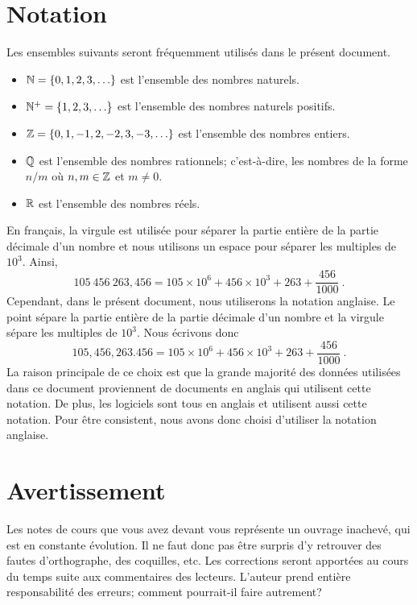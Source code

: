 \section*{Notation}

\begin{focus*}{\dfn}
Les ensembles suivants seront fréquemment utilisés dans le présent
document.
\begin{itemize}
\item $\mathbb{N} = \{0,1,2,3,\ldots \}$ est l'ensemble des nombres naturels.
\item $\mathbb{N}^+ = \{1,2,3,\ldots \}$ est l'ensemble des nombres naturels
positifs.
\item $\mathbb{Z} = \{0,1,-1,2,-2,3,-3, \ldots \}$ est l'ensemble des nombres
entiers.
\item $\mathbb{Q}$ est l'ensemble des nombres rationnels; c'est-à-dire, les
  nombres de la forme $n/m$ où $n,m \in \mathbb{Z}$ et $m \neq 0$.
\item $\mathbb{R}$ est l'ensemble des nombres réels.
\end{itemize}
\end{focus*}

En français, la virgule est utilisée pour séparer la partie entière de
la partie décimale d'un nombre et nous utilisons un espace pour séparer
les multiples de $10^3$.  Ainsi,
\[
105\ 456\ 263,456 =
105\times 10^6+ 456\times 10^3 + 263 + \frac{456}{1000} \ .
\]
Cependant, dans le présent document, nous utiliserons la notation
anglaise.  Le point sépare la partie entière de la partie décimale d'un
nombre et la virgule sépare les multiples de $10^3$.  Nous écrivons donc
\[
105,456,263.456 = 105\times 10^6+ 456\times 10^3 + 263 + \frac{456}{1000} \ .
\]
La raison principale de ce choix est que la grande majorité des
données utilisées dans ce document proviennent de documents en anglais
qui utilisent cette notation.  De plus, les logiciels sont tous en
anglais et utilisent aussi cette notation.  Pour être consistent, nous
avons donc choisi d'utiliser la notation anglaise.

\section*{Avertissement}

Les notes de cours que vous avez devant vous représente un ouvrage
inachevé, qui est en constante évolution.  Il ne faut donc pas être
surpris d'y retrouver des fautes d'orthographe, des coquilles, etc.
Les corrections seront apportées au cours du temps suite aux
commentaires des lecteurs.  L'auteur prend entière responsabilité
des erreurs; comment pourrait-il faire autrement?


